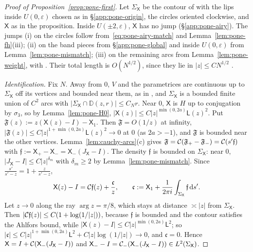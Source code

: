 \begin{proof}[Proof of Proposition~\textup{\ref{prop:pone-first}}]
Let $\Sigma_{\mathsf X}$ be the contour of \cite[(6.34)]{WLXZ} with the lips inside $U(0,\varepsilon)$ chosen as in
\S\ref{app:pone-origin}, the circles oriented clockwise, and $\mathsf X$ as in the proposition. Inside $U(\pm2,\varepsilon)$,
$\mathsf X$ has no jump (\S\ref{app:pone-airy}). The jumps (i) on the circles follow from~\eqref{eq:pone-airy-match} and
Lemma~\ref{lem:pone-fh}(iii); (ii) on the band pieces from \S\ref{app:pone-global} and inside $U(0,\varepsilon)$ from
Lemma~\ref{lem:pone-mismatch}; (iii) on the remaining arcs from Lemma~\ref{lem:pone-weight}, with \cite[(5.8), (6.34)]{WLXZ}.
Their total length is $O(N^{1/2})$, since they lie in $|z|\le CN^{1/2}$ \cite[(3.2)]{WLXZ}.

\emph{Identification.} Fix $N$. Away from $0$, $V$ and the parametrices are continuous up to $\Sigma_{\mathsf X}$ off its
vertices and bounded near them, as in \cite[\S6]{WLXZ}, and $\Sigma_{\mathsf X}$ is a bounded finite union of $C^2$ arcs with
$|\Sigma_{\mathsf X}\cap\mathbb D(z,r)|\le C_Nr$. Near $0$, $\mathsf X$ is $H$ up to conjugation by $\sigma_3$, so by
Lemma~\ref{lem:pone-H0}, $|\mathsf X(z)|\le C|z|^{\min(0,2a)}\mathsf L(z)^2$. Put $\mathfrak F(z):=z(\mathsf X(z)-I)-\mathsf X_1$. Then
$\mathfrak F=O(1/z)$ at infinity, $|\mathfrak F(z)|\le C|z|^{1+\min(0,2a)}\mathsf L(z)^2\to0$ at $0$ (as $2a>-1$), and $\mathfrak F$ is
bounded near the other vertices. Lemma~\ref{lem:cauchy-arcs}(c) gives
$\mathfrak F=\mathcal{C}(\mathfrak F_+-\mathfrak F_-)=\mathcal{C}(s'\mathfrak f)$ with $\mathfrak f:=\mathsf X_+-\mathsf X_-=\mathsf X_-(J_{\mathsf X}-I)$.
The density $\mathfrak f$ is bounded on $\Sigma_{\mathsf X}$: near $0$, $|J_{\mathsf X}-I|\le C|z|^{\delta_m}$ with $\delta_m\ge2$ by
Lemma~\ref{lem:pone-mismatch}. Since $\frac{s'}{s'-z}=1+\frac z{s'-z}$,
\[
  \mathsf X(z)-I=\mathcal{C}\mathfrak f(z)+\frac{\mathfrak c}z,\qquad \mathfrak c:=\mathsf X_1+\frac1{2\pi i}\int_{\Sigma_{\mathsf X}}\mathfrak f\,\mathrm{d} s'.
\]
Let $z\to0$ along the ray $\arg z=\pi/8$, which stays at distance $\asymp|z|$ from $\Sigma_{\mathsf X}$. Then
$|\mathcal{C}\mathfrak f(z)|\le C(1+\log(1/|z|))$, because $\mathfrak f$ is bounded and the contour satisfies the Ahlfors bound, while
$|\mathsf X(z)-I|\le C|z|^{\min(0,2a)}\mathsf L^2$; so $|\mathfrak c|\le C|z|^{1+\min(0,2a)}\mathsf L^2+C|z|\log(1/|z|)\to0$, and
$\mathfrak c=0$. Hence $\mathsf X=I+\mathcal{C}(\mathsf X_-(J_{\mathsf X}-I))$ and $\mathsf X_--I=\mathcal{C}_-(\mathsf X_-(J_{\mathsf X}-I))\in
L^2(\Sigma_{\mathsf X})$.


\end{proof}
